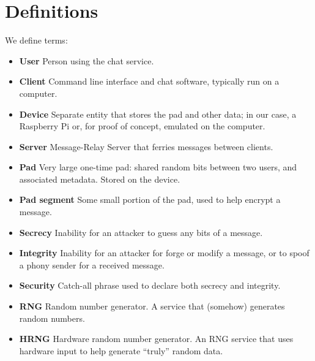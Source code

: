 \documentclass[twocolumn]{article}
\begin{document}
\section{Definitions}
We define terms:
\begin{itemize} \itemsep0em 
  \item \textbf{User} Person using the chat service.
  \item \textbf{Client} Command line interface and chat software, typically run on a computer.
  \item \textbf{Device} Separate entity that stores the pad and other data; in our case, a Raspberry Pi or, for proof of concept, emulated on the computer.
  \item \textbf{Server} Message-Relay Server that ferries messages between clients.
  \item \textbf{Pad} Very large one-time pad: shared random bits between two users, and associated metadata. Stored on the device.
  \item \textbf{Pad segment} Some small portion of the pad, used to help encrypt a message.
  \item \textbf{Secrecy} Inability for an attacker to guess any bits of a message.
  \item \textbf{Integrity} Inability for an attacker for forge or modify a message, or to spoof a phony sender for a received message.
  \item \textbf{Security} Catch-all phrase used to declare both secrecy and integrity.
  \item \textbf{RNG} Random number generator. A service that (somehow) generates random numbers.
  \item \textbf{HRNG} Hardware random number generator. An RNG service that uses hardware input to help generate ``truly'' random data.
\end{itemize}
\end{document}

